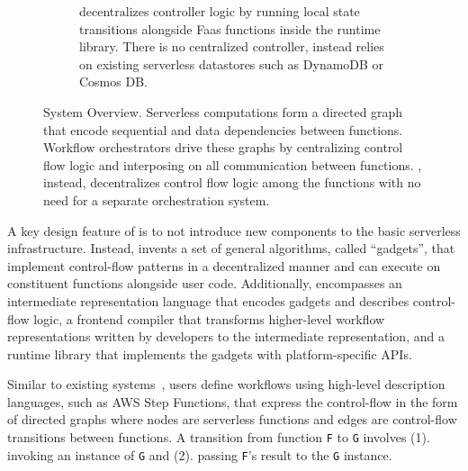 \begin{figure}[t]
\begin{subfigure}[b]{\columnwidth}
        \caption{\name{} decentralizes controller logic by running local state
                 transitions alongside Faas functions inside the \name{} runtime
                library. There is no centralized controller, instead \name{} relies on existing
                serverless datastores such as DynamoDB or Cosmos DB.}
        \label{fig:arch:unum-runtime}
    \end{subfigure}
    \caption{\name{} System Overview. Serverless computations form a directed
            graph that encode sequential and data dependencies between functions. Workflow
            orchestrators drive these graphs by centralizing control flow logic and
            interposing on all communication between functions. \name{},
            instead, decentralizes control flow logic among the functions with
            no need for a separate orchestration system.}
    \label{fig:arch}
\end{figure}


A key design feature of \name{} is to not introduce new components to the
basic serverless infrastructure. Instead, \name{} invents a set of general
algorithms, called ``gadgets'', that implement control-flow patterns in a
decentralized manner and can execute on constituent functions alongside user
code. Additionally, \name{} encompasses an intermediate representation
language that encodes gadgets and describes control-flow logic, a frontend
compiler that transforms higher-level workflow representations written by
developers to the intermediate representation, and a runtime library that
implements the gadgets with platform-specific APIs.

Similar to existing systems~\cite{aws-step-functions, google-workflows,
google-cloud-composer, gg-atc}, \name{} users define workflows using
high-level description languages, such as AWS Step Functions, that express the
control-flow in the form of directed graphs where nodes are serverless
functions and edges are control-flow transitions between functions. A
transition from function \texttt{F} to \texttt{G} involves (1). invoking an
instance of \texttt{G} and (2). passing \texttt{F}'s result to the \texttt{G}
instance.

